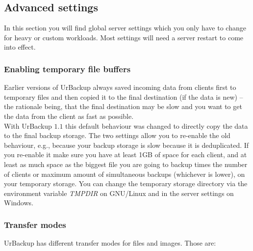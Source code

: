 \documentclass[a4paper,10pt]{article}
\begin{document}
\subsection{Advanced settings}

In this section you will find global server settings which you only have to
change for heavy or custom workloads. Most settings will need a server restart
to come into effect.

\subsubsection{Enabling temporary file buffers}
\label{temp_file_buffers}

Earlier versions of UrBackup always saved incoming data from clients first to temporary
files and then copied it to the final destination (if the data is new) -- the rationale
being, that the final destination may be slow and you want to get the data from the client
as fast as possible.\\
With UrBackup $1.1$ this default behaviour was changed to directly copy the data to the
final backup storage. The two settings allow you to re-enable the old behaviour, e.g.,
because your backup storage is slow because it is deduplicated. If you re-enable it
make sure you have at least 1GB of space for each client, and at least as much space as
the biggest file you are going to backup times the number of clients or maximum amount of simultaneous backups (whichever is lower), on your temporary storage. You can change the temporary storage directory via the environment variable \textsl{TMPDIR} on GNU/Linux and in the server settings on Windows.

\subsubsection{Transfer modes}

UrBackup has different transfer modes for files and images. Those are:
\end{document}
